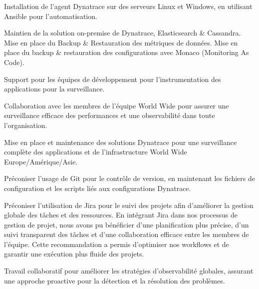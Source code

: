 \begin{cventries}
{\begin{cvitems}
{{\begin{cvitems}
    \item {Installation de l'agent Dynatrace sur des serveurs Linux et Windows, en utilisant Ansible pour l'automatisation.}
    \item {Maintien de la solution on-premise de Dynatrace, Elasticsearch \& Cassandra. Mise en place du Backup \& Restauration des métriques de données. Mise en place du backup \& restauration des configurations avec Monaco (Monitoring As Code).}
    \item {Support pour les équipes de développement pour l'instrumentation des applications pour la surveillance.}
    \item {Collaboration avec les membres de l'équipe World Wide pour assurer une surveillance efficace des performances et une observabilité dans toute l'organisation.}
    \item {Mise en place et maintenance des solutions Dynatrace pour une surveillance complète des applications et de l'infrastructure World Wide Europe/Amérique/Asie.}
    \item {Préconiser l'usage de Git pour le contrôle de version, en maintenant les fichiers de configuration et les scripts liés aux configurations Dynatrace.}
    \item {Préconiser l'utilisation de Jira pour le suivi des projets afin d'améliorer la gestion globale des tâches et des ressources. En intégrant Jira dans nos processus de gestion de projet, nous avons pu bénéficier d'une planification plus précise, d'un suivi transparent des tâches et d'une collaboration efficace entre les membres de l'équipe. Cette recommandation a permis d'optimiser nos workflows et de garantir une exécution plus fluide des projets.}
    \item {Travail collaboratif pour améliorer les stratégies d'observabilité globales, assurant une approche proactive pour la détection et la résolution des problèmes.}
  \end{cvitems}
}

}
\end{cvitems}}
\end{cventries}
